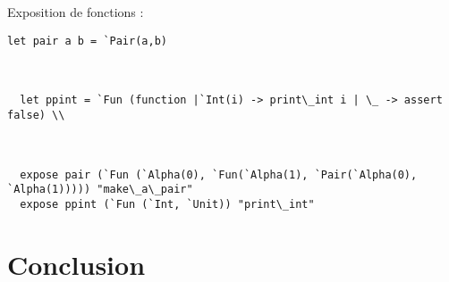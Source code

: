 \documentclass[french,xcolor={usenames,dvipsnames}]{beamer}
\begin{document}
\begin{frame}[fragile]
  Exposition de fonctions : \\
  
  \begin{lstlisting}[language=caml]
  let pair a b = `Pair(a,b) 



  let ppint = `Fun (function |`Int(i) -> print\_int i | \_ -> assert false) \\



  expose pair (`Fun (`Alpha(0), `Fun(`Alpha(1), `Pair(`Alpha(0), `Alpha(1))))) "make\_a\_pair"
  expose ppint (`Fun (`Int, `Unit)) "print\_int"

  \end{lstlisting}
\end{frame}

\section{Conclusion}
\end{document}
